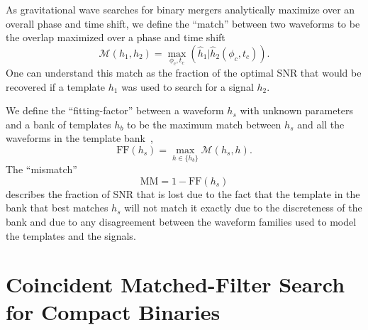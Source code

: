 As gravitational wave searches for binary mergers analytically maximize over an
overall phase and time shift, we define the ``match'' between two waveforms
to be the overlap maximized over a phase and time shift
%
\begin{equation}
\mathcal{M}(h_1,h_2) =
\underset{\phi_c,t_c}{\max}(\hat{h}_1|\hat{h}_2(\phi_c,t_c)).
\end{equation}
%
One can understand this match as the fraction of the optimal \ac{SNR} that would
be recovered if a template $h_1$ was used to search for a signal $h_2$.

We define the ``fitting-factor'' between a waveform $h_s$ with unknown
parameters
and a bank of templates $h_b$ to be the maximum match between $h_s$ and all the
waveforms in the template bank~\cite{Apostolatos:1995pj},
%
\begin{equation}
\mathrm{FF}(h_s) = \max_{h \in \{h_b\}} \mathcal{M}(h_s,h).
\end{equation}
%
The ``mismatch''
%
\begin{equation}
\mathrm{MM} = 1 - \mathrm{FF}(h_s)
\end{equation}
%
describes the fraction of \ac{SNR} that is lost due to the fact that the
template in the bank that best matches $h_s$ will not match it exactly due to
the discreteness of the bank and due to any disagreement between the waveform 
families used to model the templates and the signals. 

\section{Coincident Matched-Filter Search for Compact Binaries}
\label{s:search}

